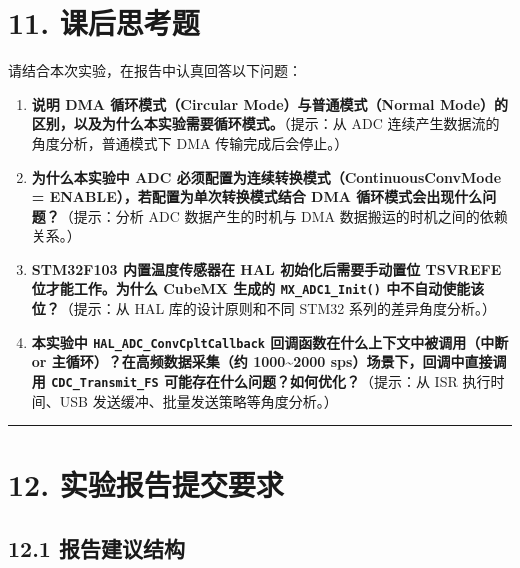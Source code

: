 \documentclass[
  chinese,
  UTF8,
  oneside,
  openany]{ctexbook}
\providecommand{\tightlist}{%
  \setlength{\itemsep}{0pt}\setlength{\parskip}{0pt}}
\begin{document}
\section{11. 课后思考题}\label{ux8bfeux540eux601dux8003ux9898-2}

请结合本次实验，在报告中认真回答以下问题：

\begin{enumerate}
\def\labelenumi{\arabic{enumi}.}
\tightlist
\item
  \textbf{说明 DMA 循环模式（Circular Mode）与普通模式（Normal
  Mode）的区别，以及为什么本实验需要循环模式。}（提示：从 ADC
  连续产生数据流的角度分析，普通模式下 DMA 传输完成后会停止。）
\item
  \textbf{为什么本实验中 ADC 必须配置为连续转换模式（ContinuousConvMode
  = ENABLE），若配置为单次转换模式结合 DMA
  循环模式会出现什么问题？}（提示：分析 ADC 数据产生的时机与 DMA
  数据搬运的时机之间的依赖关系。）
\item
  \textbf{STM32F103 内置温度传感器在 HAL 初始化后需要手动置位 TSVREFE
  位才能工作。为什么 CubeMX 生成的 \texttt{MX\_ADC1\_Init()}
  中不自动使能该位？}（提示：从 HAL 库的设计原则和不同 STM32
  系列的差异角度分析。）
\item
  \textbf{本实验中 \texttt{HAL\_ADC\_ConvCpltCallback}
  回调函数在什么上下文中被调用（中断 or 主循环）？在高频数据采集（约
  1000\textasciitilde2000 sps）场景下，回调中直接调用
  \texttt{CDC\_Transmit\_FS} 可能存在什么问题？如何优化？}（提示：从 ISR
  执行时间、USB 发送缓冲、批量发送策略等角度分析。）
\end{enumerate}

\begin{center}\rule{0.5\linewidth}{0.5pt}\end{center}

\section{12.
实验报告提交要求}\label{ux5b9eux9a8cux62a5ux544aux63d0ux4ea4ux8981ux6c42-2}

\subsection{12.1
报告建议结构}\label{ux62a5ux544aux5efaux8baeux7ed3ux6784-5}
\end{document}
